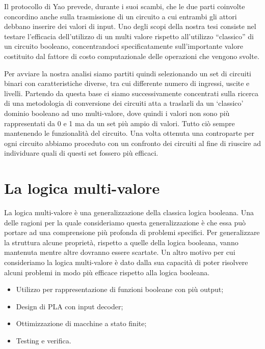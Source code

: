 \documentclass[italian,]{book}
\providecommand{\tightlist}{%
  \setlength{\itemsep}{0pt}\setlength{\parskip}{0pt}}
\begin{document}
Il protocollo di Yao prevede, durante i suoi scambi, che le due parti coinvolte concordino anche sulla trasmissione di un circuito a cui entrambi gli attori debbano inserire dei valori di input. Uno degli scopi della nostra tesi consiste nel testare l'efficacia dell'utilizzo di un multi valore rispetto all'utilizzo ``classico'' di un circuito booleano, concentrandoci specificatamente sull'importante valore costituito dal fattore di costo computazionale delle operazioni che vengono svolte.

Per avviare la nostra analisi siamo partiti quindi selezionando un set di circuiti binari con caratteristiche diverse, tra cui differente numero di ingressi, uscite e livelli. Partendo da questa base ci siamo successivamente concentrati sulla ricerca di una metodologia di conversione dei circuiti atta a traslarli da un `classico' dominio booleano ad uno multi-valore, dove quindi i valori non sono più rappresentati da 0 e 1 ma da un set più ampio di valori. Tutto ciò sempre mantenendo le funzionalità del circuito. Una volta ottenuta una controparte per ogni circuito abbiamo proceduto con un confronto dei circuiti al fine di riuscire ad individuare quali di questi set fossero più efficaci.

\newpage

\hypertarget{la-logica-multi-valore}{%
\section{La logica multi-valore}\label{la-logica-multi-valore}}

La logica multi-valore è una generalizzazione della classica logica booleana. Una delle ragioni per la quale consideriamo questa generalizzazione è che essa può portare ad una comprensione più profonda di problemi specifici. Per generalizzare la struttura alcune proprietà, rispetto a quelle della logica booleana, vanno mantenuta mentre altre dovranno essere scartate. Un altro motivo per cui consideriamo la logica multi-valore è dato dalla sua capacità di poter risolvere alcuni problemi in modo più efficace rispetto alla logica booleana.

\begin{itemize}
\tightlist
\item
  Utilizzo per rappresentazione di funzioni booleane con più output;
\item
  Design di PLA con input decoder;
\item
  Ottimizzazione di macchine a stato finite;
\item
  Testing e verifica.
\end{itemize}
\end{document}
